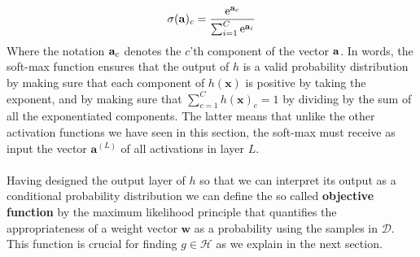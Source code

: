 $$
\sigma(\mathbf{a})_c = \frac{\mathrm{e}^{\mathbf{a}_c}}{\sum_{i = 1}^C \mathrm{e}^{\mathbf{a}_i}}
$$ 
Where the notation $\mathbf{a}_c$ denotes the $c$'th component of the vector $\mathbf{a}$. In words, the soft-max function ensures that the output of $h$ is a valid probability distribution by making sure that each component of $h(\mathbf{x})$ is positive by taking the exponent, and by making sure that $\sum_{c=1}^Ch(\mathbf{x})_c = 1$ by dividing by the sum of all the exponentiated components. The latter means that unlike the other activation functions we have seen in this section, the soft-max must receive as input the vector $\mathbf{a}^{(L)}$ of all activations in layer $L$.
\\\\
Having designed the output layer of $h$ so that we can interpret its output as a conditional probability distribution we can define the so called \textbf{objective function} by the maximum likelihood principle that quantifies the appropriateness of a weight vector $\mathbf{w}$ as a probability using the samples in $\mathcal{D}$. This function is crucial for finding $g \in \mathcal{H}$ as we explain in the next section.

